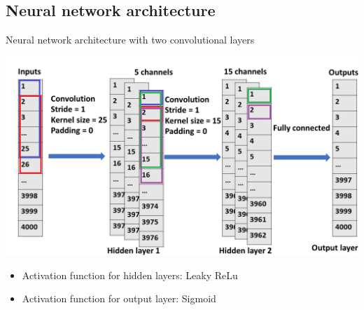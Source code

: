 \subsection{Neural network architecture}
\begin{frame}{Neural network architecture with two convolutional layers}
    \begin{center}
      \includegraphics[width=0.75\linewidth, trim=0 30 0 0]{images/CNN_2.png}
   \end{center}
   \begin{itemize}
       \item Activation function for hidden layers: Leaky ReLu
       \item Activation function for output layer: Sigmoid
   \end{itemize}
\end{frame}

